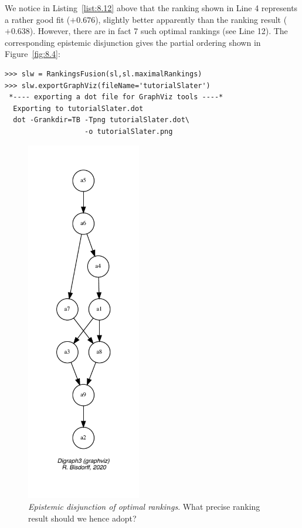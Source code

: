 We notice in Listing~\ref{list:8.12} above that the \Slater ranking shown in Line 4 represents a rather good fit ($+0.676$), slightly better apparently than the \NetFlows ranking result ($+0.638$). However, there are in fact 7 such optimal \Slater rankings (see Line 12). The corresponding epistemic disjunction gives the partial ordering shown in Figure~\vref{fig:8.4}:
\begin{lstlisting}[caption={Computing the epistemic disjunction of optimal \Slater rankings},label=list:8.13]   
>>> slw = RankingsFusion(sl,sl.maximalRankings)
>>> slw.exportGraphViz(fileName='tutorialSlater')
 *---- exporting a dot file for GraphViz tools ----*
  Exporting to tutorialSlater.dot
  dot -Grankdir=TB -Tpng tutorialSlater.dot\
                   -o tutorialSlater.png
\end{lstlisting}
\begin{figure}[ht]
\sidecaption[t]
\includegraphics[width=5cm]{Figures/8-4-tutorialSlater.pdf}
\caption[Epistemic disjunction of optimal \Slater rankings]{\emph{Epistemic disjunction of optimal \Slater rankings}. What precise \Slater ranking result should we hence adopt?}
\label{fig:8.4}       %
\end{figure}
       
